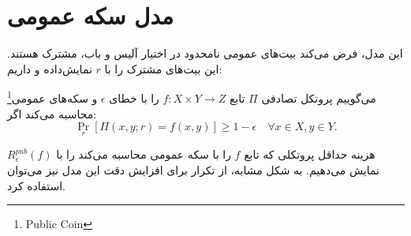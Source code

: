 \section{مدل سکه عمومی}
این مدل، فرض می‌کند بیت‌های عمومی نامحدود در اختیار آلیس و باب، مشترک هستند. این بیت‌های مشترک را با $r$ نمایش‌داده و داریم:
\begin{definition}
می‌گوییم پروتکل تصادفی $\Pi$ تابع $f : X \times Y \rightarrow Z$ را با خطای $\epsilon$ و سکه‌های عمومی\footnote{Public Coin} محاسبه می‌کند اگر:
\begin{equation}
\Pr_{r} [\Pi(x, y; r) = f(x,y)] \geq 1 - \epsilon \quad \forall x \in X, y \in Y.
\end{equation}
\end{definition}
هزینه حداقل پروتکلی که تابع $f$ را با سکه عمومی محاسبه می‌کند را با $R_\epsilon^{pub} (f)$ نمایش می‌دهیم. به شکل مشابه، از تکرار برای افزایش دقت این مدل نیز می‌توان استفاده کرد.
